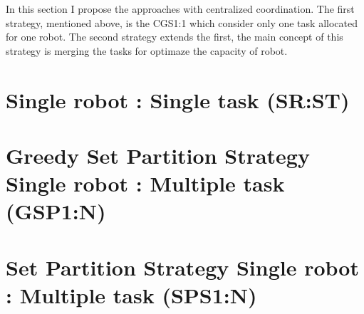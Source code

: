 In this section I propose the approaches with centralized coordination.
The first strategy, mentioned above, is the CGS1:1 which consider only 
one task allocated for one robot.
The second strategy extends the first, the main concept of this strategy 
is merging the tasks for optimaze the capacity of robot.

\section{Single robot : Single task (SR:ST)}

\srst


\section{Greedy Set Partition Strategy Single robot : Multiple task (GSP1:N)}

\gsp

\section{Set Partition Strategy Single robot : Multiple task (SPS1:N)}

\sps